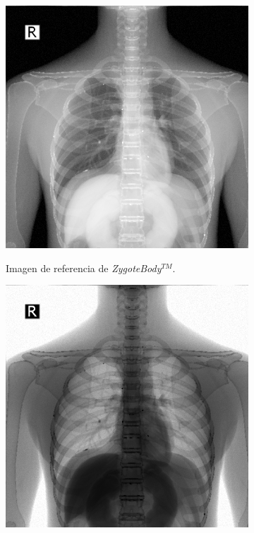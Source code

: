 \begin{figure}[ht]
\begin{subfigure}[b]{0.3\linewidth}
        \centering
        {\includegraphics[width=\linewidth]{IMG/XRayMaleNormal2.png}}
        \caption{Imagen de referencia de  \emph{ZygoteBody}$^{TM}$. \label{xraynormal}}
    \end{subfigure}
    \null\hfill
    \begin{subfigure}[b]{0.3\linewidth}
        \centering
        {\includegraphics[width=\linewidth]{IMG/XrayMaleNegative2.png}}

\end{subfigure}
\end{figure}
